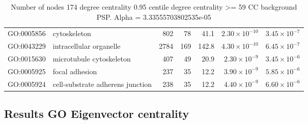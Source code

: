\begin{table}[ht]
\begin{adjustbox}{max width=\textwidth}
\begin{tabular}{llrrrrr}
  GO:0005856 & cytoskeleton & 802 & 78 & 41.1 & $2.30 \times 10^{-10}$ & $3.45 \times 10^{-7}$ \\ 
  GO:0043229 & intracellular organelle & 2784 & 169 & 142.8 & $4.30 \times 10^{-10}$ & $6.45 \times 10^{-7}$ \\ 
  GO:0015630 & microtubule cytoskeleton & 407 & 49 & 20.9 & $2.30 \times 10^{-9}$ & $3.45 \times 10^{-6}$ \\ 
  GO:0005925 & focal adhesion & 237 & 35 & 12.2 & $3.90 \times 10^{-9}$ & $5.85 \times 10^{-6}$ \\ 
  GO:0005924 & cell-substrate adherens junction & 238 & 35 & 12.2 & $4.40 \times 10^{-9}$ & $6.60 \times 10^{-6}$ \\ 
   \hline
\end{tabular}
\end{adjustbox}
\caption{Number of nodes 174 degree centrality 0.95 centile  degree centrality >= 59 CC background PSP. Alpha = 3.33555703802535e-05} 
\label{tab:Number of nodes 174 degree centrality 0.95 centile  degree centrality >= 59 CC background PSP. Alpha = 3.33555703802535e-05}
\end{table}


\subsection{Results GO Eigenvector centrality}




